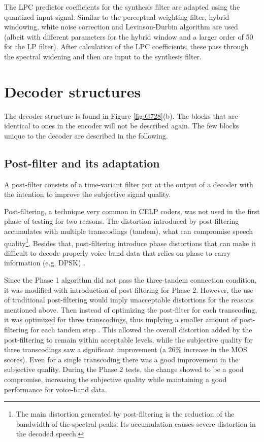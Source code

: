 The LPC predictor coefficients for the synthesis filter are adapted
using the quantized input signal. Similar to the perceptual weighting
filter, hybrid windowing, white noise correction and Levinson-Durbin
algorithm are used (albeit with different parameters for the hybrid
window and a larger order of 50 for the LP filter). After calculation
of the LPC coefficients, these pass through the spectral widening and
then are input to the synthesis filter.



\section{Decoder structures}

The decoder structure is found in Figure \ref{fig:G728}(b). The blocks
that are identical to ones in the encoder will not be described
again. The few blocks unique to the decoder are described in the
following.

\subsection{Post-filter and its adaptation} 

A post-filter \cite{PostFilter-Basic} consists of a time-variant
filter put at the output of a decoder with the intention to improve
the subjective signal quality.

Post-filtering, a technique very common in CELP coders, was not used
in the first phase of testing for two reasons. The distortion
introduced by post-filtering accumulates with multiple transcodings
(tandem), what can compromise speech quality\footnote{\sf The main
  distortion generated by post-filtering is the reduction of the
  bandwidth of the spectral peaks. Its accumulation causes severe
  distortion in the decoded speech.}.  Besides that, post-filtering
introduce phase distortions that can make it difficult to decode
properly voice-band data that relies on phase to carry information
(e.g. DPSK) \cite{LD-CELP-1-rev,LD-CELP-Phase1}.

Since the Phase 1 algorithm did not pass the three-tandem connection
condition, it was modified with introduction of post-filtering for
Phase 2. However, the use of traditional post-filtering would imply
unacceptable distortions for the reasons mentioned above. Then instead
of optimizing the post-filter for each transcoding, it was optimized
for three transcodings, thus implying a smaller amount of
post-filtering for each tandem step \cite{LD-CELP-Phase2}. This
allowed the overall distortion added by the post-filtering to remain
within acceptable levels, while the subjective quality for three
transcodings saw a significant improvement (a 26\% increase in the MOS
scores). Even for a single transcoding there was a good improvement in
the subjective quality. During the Phase 2 tests, the change showed to
be a good compromise, increasing the subjective quality while
maintaining a good performance for voice-band data.

